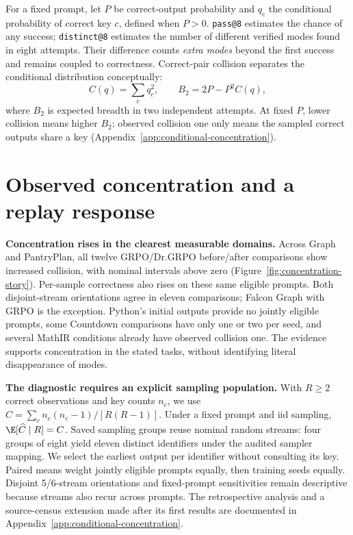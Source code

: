For a fixed prompt, let $P$ be correct-output probability and $q_c$ the
conditional probability of correct key $c$, defined when $P>0$.
\texttt{pass@8} estimates the chance of any success; \texttt{distinct@8}
estimates the number of different verified modes found in eight attempts.
Their difference counts \emph{extra modes} beyond the first success and
remains coupled to correctness. Correct-pair collision separates the
conditional distribution conceptually:
\begin{equation}
 C(q)=\sum_c q_c^2,\qquad B_2=2P-P^2C(q),
 \label{eq:workshop-collision-bridge}
\end{equation}
where $B_2$ is expected breadth in two independent attempts.
At fixed $P$, lower collision means higher $B_2$; observed collision one
only means the sampled correct outputs share a key
(Appendix~\ref{app:conditional-concentration}).



\section{Observed concentration and a replay response}
\label{sec:collapse}\label{sec:method}\label{sec:replay}\label{sec:maxrl-method}
\textbf{Concentration rises in the clearest measurable domains.}
Across Graph and PantryPlan, all twelve GRPO/Dr.GRPO before/after comparisons
show increased collision, with nominal intervals above zero
(Figure~\ref{fig:concentration-story}). Per-sample correctness also rises on
these same eligible prompts. Both disjoint-stream orientations agree in
eleven comparisons; Falcon Graph with GRPO is the exception. Python's initial
outputs provide no jointly eligible prompts, some Countdown comparisons have
only one or two per seed, and several MathIR conditions already have observed
collision one. The evidence supports concentration in the stated tasks,
without identifying literal disappearance of modes.

\textbf{The diagnostic requires an explicit sampling population.}
With $R\ge2$ correct observations and key counts $n_c$, we use
$\widehat C=\sum_c n_c(n_c-1)/[R(R-1)]$. Under a fixed prompt and iid sampling,
$\E[\widehat C\mid R]=C$. Saved sampling groups reuse nominal random streams:
four groups of eight yield eleven distinct identifiers under the audited
sampler mapping. We select the earliest output per identifier without
consulting its key. Paired means weight jointly eligible prompts equally,
then training seeds equally. Disjoint 5/6-stream orientations and fixed-prompt
sensitivities remain descriptive because streams also recur across prompts.
The retrospective analysis and a source-census extension made after its first
results are documented in Appendix~\ref{app:conditional-concentration}.

